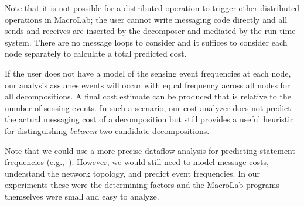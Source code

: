 Note that it is not possible for a distributed operation to trigger
other distributed operations in MacroLab; the user cannot write
messaging code directly and all sends and receives are inserted by the
decomposer and mediated by the run-time system. There are no message
loops to consider and it suffices to consider each node separately to
calculate a total predicted cost. 

If the user does not have a model of the sensing event frequencies at each
node, our analysis assumes events will occur with equal frequency across
all nodes for all decompositions. A final cost estimate can be
produced that is relative to the number of sensing events. In such a
scenario, our cost analyzer does not predict the actual messaging cost of a
decomposition but still provides a useful heuristic for distinguishing
\emph{between} two candidate decompositions.  

Note that we could use a more precise dataflow analysis for predicting
statement frequencies (e.g.,~\cite{Ramalingam}). However, we would still need
to model message costs, understand the network topology, and predict event
frequencies.  In our experiments these were the determining factors and
the MacroLab programs themselves were small and easy to analyze.






